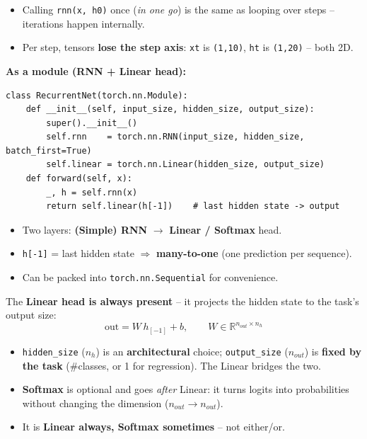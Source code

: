 \documentclass[10pt,a4paper]{article}
\begin{document}
	\begin{itemize}[leftmargin=*]
		\item Calling \texttt{rnn(x, h0)} once (\emph{in one go}) is the same as looping over steps -- iterations happen internally.
		\item Per step, tensors \textbf{lose the step axis}: \texttt{xt} is \texttt{(1,10)}, \texttt{ht} is \texttt{(1,20)} -- both 2D.
	\end{itemize}

	\textbf{As a module (RNN + Linear head):}

\begin{verbatim}
class RecurrentNet(torch.nn.Module):
    def __init__(self, input_size, hidden_size, output_size):
        super().__init__()
        self.rnn    = torch.nn.RNN(input_size, hidden_size, batch_first=True)
        self.linear = torch.nn.Linear(hidden_size, output_size)
    def forward(self, x):
        _, h = self.rnn(x)
        return self.linear(h[-1])    # last hidden state -> output
\end{verbatim}

	\begin{itemize}[leftmargin=*]
		\item Two layers: \textbf{(Simple) RNN} $\to$ \textbf{Linear / Softmax} head.
		\item \texttt{h[-1]} = last hidden state $\Rightarrow$ \textbf{many-to-one} (one prediction per sequence).
		\item Can be packed into \texttt{torch.nn.Sequential} for convenience.
	\end{itemize}

	\begin{importantbox}
		The \textbf{Linear head is always present} -- it projects the hidden state to the task's output size:
		\[
		\text{out} = W\, h_{[-1]} + b, \qquad W \in \mathbb{R}^{n_{out} \times n_h}
		\]
		\begin{itemize}[leftmargin=*]
			\item \texttt{hidden\_size} ($n_h$) is an \textbf{architectural} choice; \texttt{output\_size} ($n_{out}$) is \textbf{fixed by the task} (\#classes, or 1 for regression). The Linear bridges the two.
			\item \textbf{Softmax} is optional and goes \emph{after} Linear: it turns logits into probabilities without changing the dimension ($n_{out} \to n_{out}$).
			\item It is \textbf{Linear always, Softmax sometimes} -- not either/or.
		\end{itemize}
	\end{importantbox}
\end{document}
